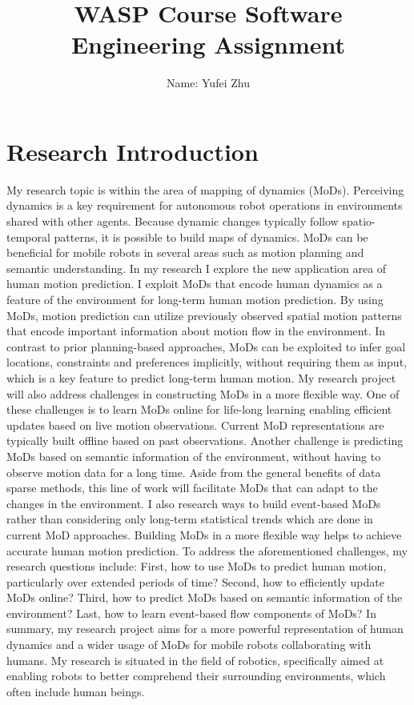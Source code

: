 \documentclass[11pt]{article}
\title{WASP Course Software Engineering Assignment}
\author{\Large Name: Yufei Zhu}
\date{}
\begin{document}
\maketitle

\section{Research Introduction}
My research topic is within the area of mapping of dynamics (MoDs). Perceiving dynamics is a key requirement for autonomous robot operations in environments shared with other agents. Because dynamic changes typically follow spatio-temporal patterns, it is possible to build maps of dynamics. MoDs can be beneficial for mobile robots in several areas such as motion planning and semantic understanding. In my research I explore the new application area of human motion prediction. I exploit MoDs that encode human dynamics as a feature of the environment for long-term human motion prediction. By using MoDs, motion prediction can utilize previously observed spatial motion patterns that encode important information about motion flow in the environment. In contrast to prior planning-based approaches, MoDs can be exploited to infer goal locations, constraints and preferences implicitly, without requiring them as input, which is a key feature to predict long-term human motion. My research project will also address challenges in constructing MoDs in a more flexible way. One of these challenges is to learn MoDs online for life-long learning enabling efficient updates based on live motion observations. Current MoD representations are typically built offline based on past observations. Another challenge is predicting MoDs based on semantic information of the environment, without having to observe motion data for a long time. Aside from the general benefits of data sparse methods, this line of work will facilitate MoDs that can adapt to the changes in the environment. I also research ways to build event-based MoDs rather than considering only long-term statistical trends which are done in current MoD approaches. Building MoDs in a more flexible way helps to achieve accurate human motion prediction. To address the aforementioned challenges, my research questions include: First, how to use MoDs to predict human motion, particularly over extended periods of time? Second, how to efficiently update MoDs online? Third, how to predict MoDs based on semantic information of the environment? Last, how to learn event-based flow components of MoDs? In summary, my research project aims for a more powerful representation of human dynamics and a wider usage of MoDs for mobile robots collaborating with humans. My research is situated in the field of robotics, specifically aimed at enabling robots to better comprehend their surrounding environments, which often include human beings.
\end{document}
